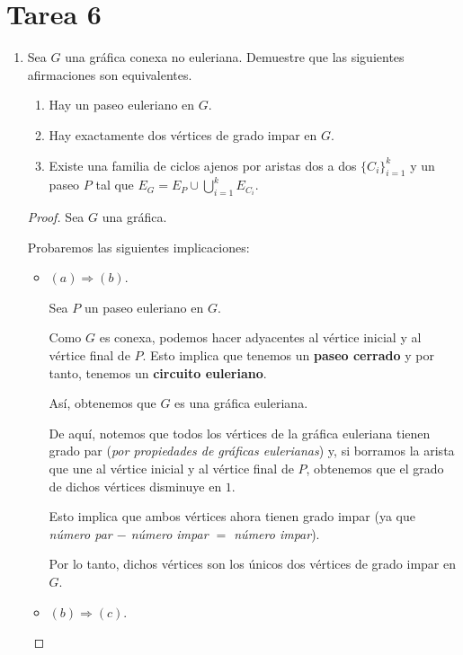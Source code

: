 \documentclass{article}
\begin{document}
  \section*{\LARGE{Tarea 6}}
    \begin{enumerate}
      \item Sea $G$ una gr\'afica conexa no euleriana.   Demuestre que
        las siguientes afirmaciones son equivalentes.
        \begin{enumerate}
        \item Hay un paseo euleriano en $G$.

        \item Hay exactamente dos v\'ertices de grado impar en $G$.

        \item Existe una familia de ciclos ajenos por aristas dos
          a dos $\{ C_i \}_{i=1}^k$ y un paseo $P$ tal que
          $E_G = E_P \cup \bigcup_{i=1}^k E_{C_i}$.
        \end{enumerate}

        \begin{proof}
          Sea $G$ una gráfica.

          Probaremos las siguientes implicaciones:
          \begin{itemize}
            \item $(a) \Longrightarrow (b)$.

              Sea $P$ un paseo euleriano en $G$.

              Como $G$ es conexa, podemos hacer adyacentes al vértice inicial y al vértice final de $P$. Esto implica que tenemos un \textbf{paseo cerrado} y por tanto, tenemos un \textbf{circuito euleriano}.

              Así, obtenemos que $G$ es una gráfica euleriana.

              De aquí, notemos que todos los vértices de la gráfica euleriana tienen grado par (\textit{por propiedades de gráficas eulerianas}) y, si borramos la arista que une al vértice inicial y al vértice final de $P$, obtenemos que el grado de dichos vértices disminuye en $1$.

              Esto implica que ambos vértices ahora tienen grado impar (ya que \textit{número par $-$ número impar $=$ número impar}).

              Por lo tanto, dichos vértices son los únicos dos vértices de grado impar en $G$.

            \item $(b) \Longrightarrow (c)$.


\end{itemize}
\end{proof}
\end{enumerate}
\end{document}
